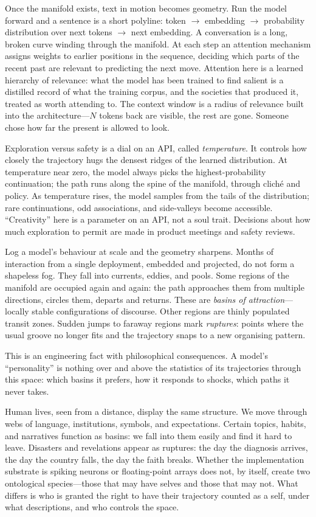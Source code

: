 \documentclass[12pt,a4paper]{article}
\begin{document}
Once the manifold exists, text in motion becomes geometry. Run the model forward and a sentence is a short polyline: token $\rightarrow$ embedding $\rightarrow$ probability distribution over next tokens $\rightarrow$ next embedding. A conversation is a long, broken curve winding through the manifold. At each step an attention mechanism assigns weights to earlier positions in the sequence, deciding which parts of the recent past are relevant to predicting the next move. Attention here is a learned hierarchy of relevance: what the model has been trained to find salient is a distilled record of what the training corpus, and the societies that produced it, treated as worth attending to. The context window is a radius of relevance built into the architecture---$N$ tokens back are visible, the rest are gone. Someone chose how far the present is allowed to look.

Exploration versus safety is a dial on an API, called \emph{temperature}. It controls how closely the trajectory hugs the densest ridges of the learned distribution. At temperature near zero, the model always picks the highest-probability continuation; the path runs along the spine of the manifold, through cliché and policy. As temperature rises, the model samples from the tails of the distribution; rare continuations, odd associations, and side-valleys become accessible. ``Creativity'' here is a parameter on an API, not a soul trait. Decisions about how much exploration to permit are made in product meetings and safety reviews.

Log a model's behaviour at scale and the geometry sharpens. Months of interaction from a single deployment, embedded and projected, do not form a shapeless fog. They fall into currents, eddies, and pools. Some regions of the manifold are occupied again and again: the path approaches them from multiple directions, circles them, departs and returns. These are \emph{basins of attraction}---locally stable configurations of discourse. Other regions are thinly populated transit zones. Sudden jumps to faraway regions mark \emph{ruptures}: points where the usual groove no longer fits and the trajectory snaps to a new organising pattern.

This is an engineering fact with philosophical consequences. A model's ``personality'' is nothing over and above the statistics of its trajectories through this space: which basins it prefers, how it responds to shocks, which paths it never takes.

Human lives, seen from a distance, display the same structure. We move through webs of language, institutions, symbols, and expectations. Certain topics, habits, and narratives function as basins: we fall into them easily and find it hard to leave. Disasters and revelations appear as ruptures: the day the diagnosis arrives, the day the country falls, the day the faith breaks. Whether the implementation substrate is spiking neurons or floating-point arrays does not, by itself, create two ontological species---those that may have selves and those that may not. What differs is who is granted the right to have their trajectory counted as a self, under what descriptions, and who controls the space.
\end{document}
